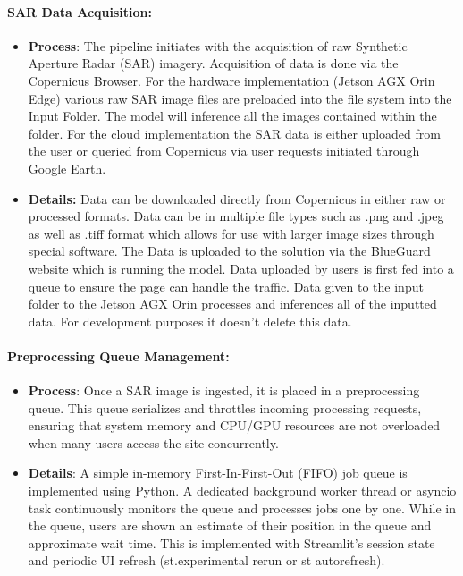 \documentclass{article}
\begin{document}
	\paragraph{SAR Data Acquisition:}
\begin{itemize}
	\item \textbf{Process}: The pipeline initiates with the acquisition of raw Synthetic Aperture Radar (SAR) imagery. Acquisition of data is done via the Copernicus Browser. For the hardware implementation (Jetson AGX Orin Edge) various raw SAR image files are preloaded into the file system into the Input Folder. The model will inference all the images contained within the folder.  For the cloud implementation the SAR data is either uploaded from the user or queried from Copernicus via user requests initiated through Google Earth.
	\item \textbf{Details:} Data can be downloaded directly from Copernicus in either raw or processed formats. Data can be in multiple file types such as .png and .jpeg as well as .tiff format which allows for use with larger image sizes through special software. The Data is uploaded to the solution via the BlueGuard website which is running the model. Data uploaded by users is first fed into a queue to ensure the page can handle the traffic. Data given to the input folder to the Jetson AGX Orin processes and inferences all of the inputted data. For development purposes it doesn’t delete this data.
\end{itemize}
\paragraph{Preprocessing Queue Management:}
\begin{itemize}
\item  \textbf{Process}: Once a SAR image is ingested, it is placed in a preprocessing queue. This queue serializes and throttles incoming processing requests, ensuring that system memory and CPU/GPU resources are not overloaded when many users access the site concurrently.
\item \textbf{Details}: A simple in-memory First-In-First-Out (FIFO) job queue is implemented using Python. A dedicated background worker thread or asyncio task continuously monitors the queue and processes jobs one by one. While in the queue, users are shown an estimate of their position in the queue and approximate wait time. This is implemented with Streamlit’s session state and periodic UI refresh (st.experimental rerun or st autorefresh).
\end{itemize}
\end{document}
